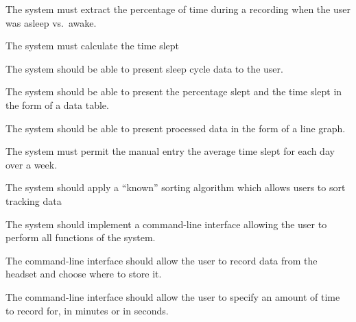 \begin{reqtable}
  {The system must extract the percentage of time during a recording when the user was asleep vs.\
    awake.}
  \phigh
  \deps{\ref{sreq:calculate-moving-average}}

  {The system must calculate the time slept}
  \phigh
  \deps{\ref{sreq:calculate-moving-average}}

  {The system should be able to present sleep cycle data to the user.}
  \phigh
  \deps{\ref{sreq:present-data-table},\ref{sreq:present-hypnogram}}

  {The system should be able to present the percentage slept and the time slept in the form of a data table.}
  \phigh
  \deps{\ref{req:extract-data}}

  {The system should be able to present processed data in the form of a line graph.}
  \phigh
  \deps{\ref{req:extract-data}}

  {The system must permit the manual entry the average time slept for each day over a week.}
  \pmed
  \dnone


  {The system should apply a ``known'' sorting algorithm which allows users to sort tracking data}
  \pmed
  \deps{\ref{req:store-data}}
  \sspec

  {The system should implement a command-line interface allowing the user to perform all functions
    of the system.}
  \phigh
  \deps{\ref{sreq:allow-user-record-data}, \ref{sreq:specify-time-record},
    \ref{sreq:allow-user-change-format}, \ref{sreq:allow-user-extract-calculate},
    \ref{sreq:cli-sort-display}}

  {The command-line interface should allow the user to record data from the headset and choose where
    to store it.}
  \phigh
  \deps{\ref{sreq:read-data-headset}, \ref{sreq:facilitate-saving}}
  \smin{13}

  {The command-line interface should allow the user to specify an amount of time to record for, in
    minutes or in seconds.}
  \phigh
  \deps{\ref{sreq:allow-user-record-data}}


\end{reqtable}

